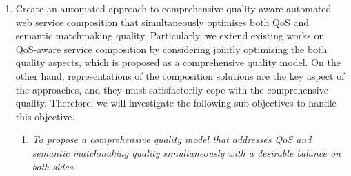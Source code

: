\begin{enumerate}
  \item Create an automated approach to comprehensive quality-aware automated web service composition that simultaneously optimises both QoS and semantic matchmaking quality. Particularly, we extend existing works on QoS-aware service composition by considering jointly optimising the both quality aspects, which is proposed as a comprehensive quality model. On the other hand, representations of the composition solutions are the key aspect of the approaches, and they must satisfactorily cope with the comprehensive quality. Therefore, we will investigate the following sub-objectives to handle this objective.
  
  
  \begin{enumerate}
    \item \emph{To propose a comprehensive quality model that addresses QoS and semantic matchmaking quality simultaneously with a desirable balance on both sides.}\\


\end{enumerate}
\end{enumerate}
